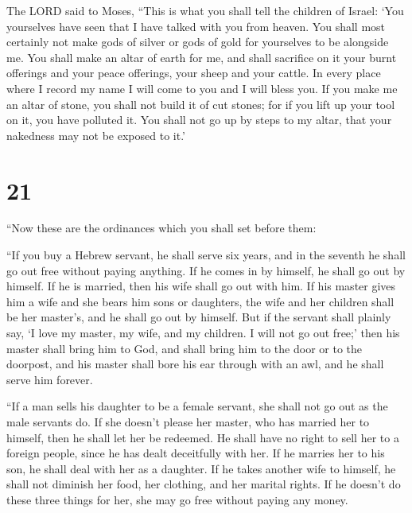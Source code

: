  The LORD said to Moses, ``This is what you shall tell the
children of Israel: `You yourselves have seen that I have talked with
you from heaven.  You shall most certainly not make gods of
silver or gods of gold for yourselves to be alongside me. 
You shall make an altar of earth for me, and shall sacrifice on it your
burnt offerings and your peace offerings, your sheep and your cattle. In
every place where I record my name I will come to you and I will bless
you.  If you make me an altar of stone, you shall not build
it of cut stones; for if you lift up your tool on it, you have polluted
it.  You shall not go up by steps to my altar, that your
nakedness may not be exposed to it.'

\hypertarget{section-20}{%
\section{21}\label{section-20}}

 ``Now these are the ordinances which you shall set before
them:

 ``If you buy a Hebrew servant, he shall serve six years,
and in the seventh he shall go out free without paying anything.
 If he comes in by himself, he shall go out by himself. If
he is married, then his wife shall go out with him.  If his
master gives him a wife and she bears him sons or daughters, the wife
and her children shall be her master's, and he shall go out by himself.
 But if the servant shall plainly say, `I love my master, my
wife, and my children. I will not go out free;'  then his
master shall bring him to God, and shall bring him to the door or to the
doorpost, and his master shall bore his ear through with an awl, and he
shall serve him forever.

 ``If a man sells his daughter to be a female servant, she
shall not go out as the male servants do.  If she doesn't
please her master, who has married her to himself, then he shall let her
be redeemed. He shall have no right to sell her to a foreign people,
since he has dealt deceitfully with her.  If he marries her
to his son, he shall deal with her as a daughter.  If he
takes another wife to himself, he shall not diminish her food, her
clothing, and her marital rights.  If he doesn't do these
three things for her, she may go free without paying any money.

